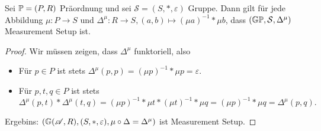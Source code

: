 \begin{proposition}
    \label{prop:MeasSetupÜberGruppe}
    Sei $\P = (P, R)$ Präordnung und sei $\mathcal{S} = (S,\ast,\varepsilon)$ Gruppe.
    Dann gilt für jede Abbildung $\mu\colon P \to S$ und $\Delta^\mu\colon R \to S, (a,b) \mapsto (\mu a)^{-1} \ast \mu b$,
    dass $(\G\P, \mathcal{S}, \Delta^\mu)$ Measurement Setup ist.
    \begin{proof}
        Wir müssen zeigen, dass $\Delta^\mu$ funktoriell, also
        \begin{itemize}
            \item Für $p \in P$ ist stets $\Delta^\mu(p,p) = (\mu p)^{-1} \ast \mu p = \varepsilon$.
            \item Für $p,t,q \in P$ ist stets
            $$ \Delta^\mu(p,t)\ast\Delta^\mu(t,q) = (\mu p)^{-1} \ast \mu t \ast (\mu t)^{-1} \ast \mu q = (\mu p)^{-1} \ast \mu q = \Delta^\mu(p,q). $$
        \end{itemize}
        Ergebins: $(\G(\mathscr{A},R),(S,\ast,\varepsilon),\mu\circ\Delta = \Delta^\mu)$ ist Measurement Setup.
    \end{proof}
\end{proposition}

